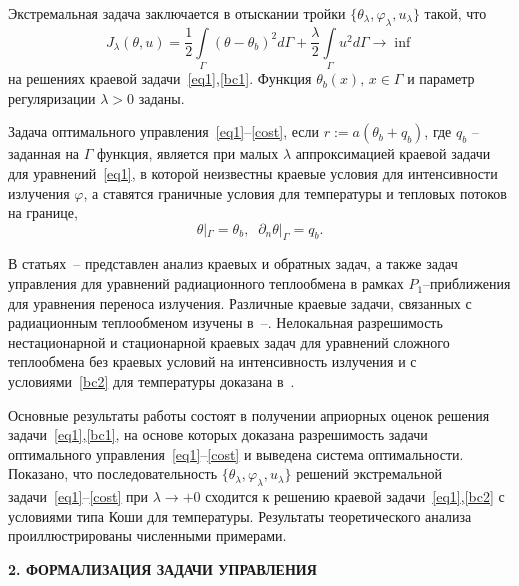\documentclass[12pt]{article}
\begin{document}
    Экстремальная задача заключается в отыскании тройки $\{\theta_\lambda,\varphi_\lambda,u_\lambda\}$
    такой, что
    \begin{equation}
        \label{cost}
        J_\lambda(\theta, u) = \frac{1}{2}\int\limits_\Gamma (\theta - \theta_b)^2d\Gamma
        + \frac{\lambda}{2}\int\limits_\Gamma u^2d\Gamma \rightarrow\inf
    \end{equation}
    на решениях краевой задачи~\eqref{eq1},\eqref{bc1}.
    Функция $\theta_b(x),\, x\in\Gamma$  и параметр регуляризации $\lambda>0$ заданы.

    Задача оптимального управления~\eqref{eq1}--\eqref{cost}, если
    $r:=a(\theta_b+q_b)$, где $q_b$ -- заданная на $\Gamma$ функция,
    является при малых $\lambda$ аппроксимацией краевой задачи для уравнений~\eqref{eq1}, в которой
    неизвестны краевые условия для интенсивности излучения $\varphi$, а ставятся
    граничные условия для температуры и тепловых потоков на границе,
    \begin{equation}
        \label{bc2}
        \theta|_\Gamma = \theta_b,\;\;
        \partial_n\theta|_\Gamma = q_b.
    \end{equation}


    В статьях~\cite{Pinnau07}--\cite{JMAA-19} представлен анализ
    краевых и обратных задач, а также задач управления
    для уравнений радиационного теплообмена
    в рамках $P_1$--приближения для уравнения
    переноса излучения.
    Различные краевые задачи, связанных с радиационным теплообменом
    изучены в~\cite{AmosA05}--\cite{Amosov18}.
    Нелокальная разрешимость
    нестационарной и стационарной краевых задач для уравнений сложного теплообмена
    без краевых условий на интенсивность излучения и
    с условиями~\eqref{bc2} для температуры доказана в~\cite{CNSNS19,CMMP20}.


    Основные результаты работы состоят в получении априорных оценок
    решения задачи~\eqref{eq1},\eqref{bc1}, на основе которых
    доказана разрешимость задачи оптимального управления~\eqref{eq1}--\eqref{cost} и выведена система оптимальности.
    Показано, что
    последовательность $\{\theta_\lambda,\varphi_\lambda,u_\lambda\}$ решений
    экстремальной задачи~\eqref{eq1}--\eqref{cost} при $\lambda\to +0$
    сходится к решению краевой задачи~\eqref{eq1},\eqref{bc2} с условиями типа Коши для температуры.
    Результаты теоретического анализа проиллюстрированы численными примерами.


    \begin{center}
        \textbf{2. ФОРМАЛИЗАЦИЯ ЗАДАЧИ УПРАВЛЕНИЯ}
    \end{center}
\end{document}
